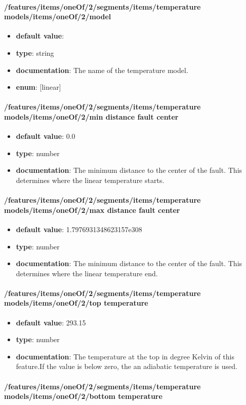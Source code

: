 \paragraph{/features/items/oneOf/2/segments/items/temperature models/items/oneOf/2/model}
\begin{itemize}\item {\bf default value}: 
\item {\bf type}: string
\item {\bf documentation}: The name of the temperature model.
\item {\bf enum}: [linear]\end{itemize}\paragraph{/features/items/oneOf/2/segments/items/temperature models/items/oneOf/2/min distance fault center}
\begin{itemize}\item {\bf default value}: 0.0
\item {\bf type}: number
\item {\bf documentation}: The minimum distance to the center of the fault. This determines where the linear temperature starts.
\end{itemize}\paragraph{/features/items/oneOf/2/segments/items/temperature models/items/oneOf/2/max distance fault center}
\begin{itemize}\item {\bf default value}: 1.7976931348623157e308
\item {\bf type}: number
\item {\bf documentation}: The minimum distance to the center of the fault. This determines where the linear temperature end.
\end{itemize}\paragraph{/features/items/oneOf/2/segments/items/temperature models/items/oneOf/2/top temperature}
\begin{itemize}\item {\bf default value}: 293.15
\item {\bf type}: number
\item {\bf documentation}: The temperature at the top in degree Kelvin of this feature.If the value is below zero, the an adiabatic temperature is used.
\end{itemize}\paragraph{/features/items/oneOf/2/segments/items/temperature models/items/oneOf/2/bottom temperature}
